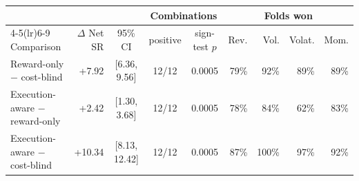 \begin{tabular}{lrcccrrrr}
\toprule
 & & & \multicolumn{2}{c}{Combinations} & \multicolumn{4}{c}{Folds won} \\
\cmidrule(lr){4-5}\cmidrule(lr){6-9}
Comparison & $\Delta$ Net SR & 95\% CI & positive & sign-test $p$ & Rev. & Vol. & Volat. & Mom. \\
\midrule
Reward-only $-$ cost-blind & +7.92 & [6.36, 9.56] & 12/12 & 0.0005 & 79\% & 92\% & 89\% & 89\% \\
Execution-aware $-$ reward-only & +2.42 & [1.30, 3.68] & 12/12 & 0.0005 & 78\% & 84\% & 62\% & 83\% \\
Execution-aware $-$ cost-blind & +10.34 & [8.13, 12.42] & 12/12 & 0.0005 & 87\% & 100\% & 97\% & 92\% \\
\bottomrule
\end{tabular}
